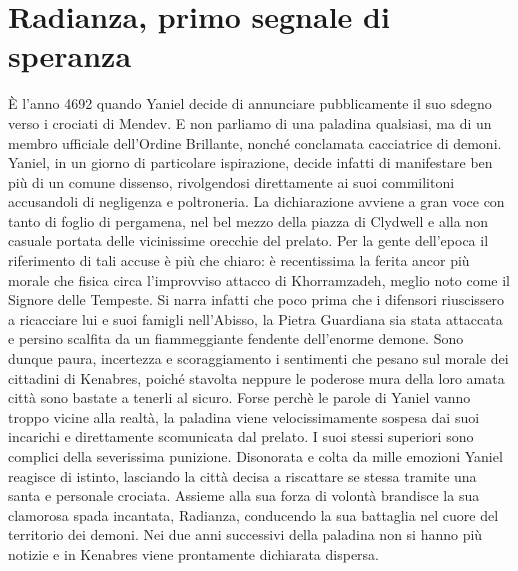 \chapter{Radianza, primo segnale di speranza}
\label{chp:cap2}

\`E l'anno 4692 quando Yaniel decide di annunciare pubblicamente il suo sdegno verso i crociati di Mendev. E non parliamo di una paladina qualsiasi, ma di un membro ufficiale dell'Ordine Brillante, nonch\'e conclamata cacciatrice di demoni. Yaniel, in un giorno di particolare ispirazione, decide infatti di manifestare ben pi\`u di un comune dissenso, rivolgendosi direttamente ai suoi commilitoni accusandoli di negligenza e poltroneria. La dichiarazione avviene a gran voce con tanto di foglio di pergamena, nel bel mezzo della piazza di Clydwell e alla non casuale portata delle vicinissime orecchie del prelato. Per la gente dell'epoca il riferimento di tali accuse \`e pi\`u che chiaro: \`e recentissima la ferita ancor pi\`u morale che fisica circa l'improvviso attacco di Khorramzadeh, meglio noto come il Signore delle Tempeste. Si narra infatti che poco prima che i difensori riuscissero a ricacciare lui e suoi famigli nell'Abisso, la Pietra Guardiana sia stata attaccata e persino scalfita da un fiammeggiante fendente dell'enorme demone. Sono dunque paura, incertezza e scoraggiamento i sentimenti che pesano sul morale dei cittadini di Kenabres, poich\'e stavolta neppure le poderose mura della loro amata citt\`a sono bastate a tenerli al sicuro.
Forse perch\`e le parole di Yaniel vanno troppo vicine alla realt\`a, la paladina viene velocissimamente sospesa dai suoi incarichi e direttamente scomunicata dal prelato. I suoi stessi superiori sono complici della severissima punizione. Disonorata e colta da mille emozioni Yaniel reagisce di istinto, lasciando la citt\`a decisa a riscattare se stessa tramite una santa e personale crociata. Assieme alla sua forza di volont\`a brandisce la sua clamorosa spada incantata, Radianza, conducendo la sua battaglia nel cuore del territorio dei demoni. Nei due anni successivi della paladina non si hanno pi\`u notizie e in Kenabres viene prontamente dichiarata dispersa.

